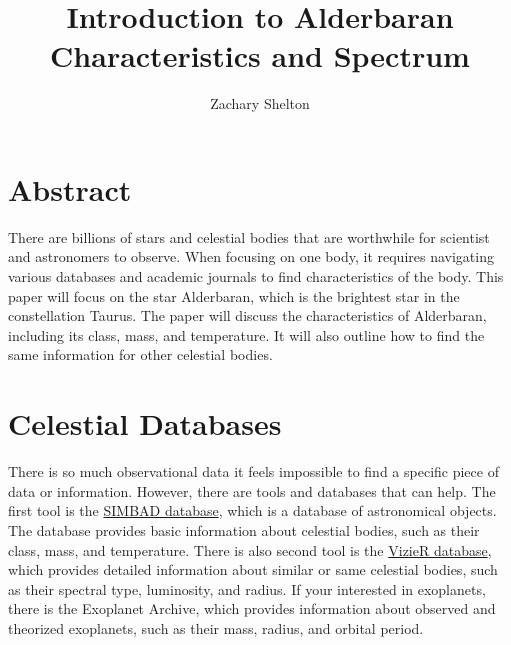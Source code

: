 \documentclass[Journal]{article}
\begin{document}

\title{Introduction to Alderbaran Characteristics and Spectrum}

\author{Zachary Shelton}

\maketitle

\section{Abstract}
There are billions of stars and celestial bodies that are worthwhile for scientist and astronomers to observe. When focusing on one body, it requires navigating various databases and academic journals to find characteristics of the body. This paper will focus on the star Alderbaran, which is the brightest star in the constellation Taurus. The paper will discuss the characteristics of Alderbaran, including its class, mass, and temperature. It will also outline how to find the same information for other celestial bodies. 

\section{Celestial Databases}
There is so much observational data it feels impossible to find a specific piece of data or information. However, there are tools and databases that can help. The first tool is the \href{https://cds.unistra.fr/}{SIMBAD database}, which is a database of astronomical objects. The database provides basic information about celestial bodies, such as their class, mass, and temperature. There is also second tool is the \href{https://vizier.cds.unistra.fr/viz-bin/VizieR}{VizieR database}, which provides detailed information about similar or same celestial bodies, such as their spectral type, luminosity, and radius. If your interested in exoplanets, there is the Exoplanet Archive, which provides information about observed and theorized exoplanets, such as their mass, radius, and orbital period.
\end{document}
